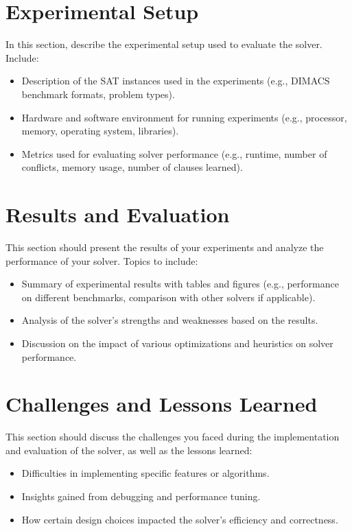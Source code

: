 \documentclass[a4paper,12pt]{article}
\begin{document}
\section{Experimental Setup}
\label{sec:experiment}
In this section, describe the experimental setup used to evaluate the solver. Include:
\begin{itemize}
    \item Description of the SAT instances used in the experiments (e.g., DIMACS benchmark formats, problem types).
    \item Hardware and software environment for running experiments (e.g., processor, memory, operating system, libraries).
    \item Metrics used for evaluating solver performance (e.g., runtime, number of conflicts, memory usage, number of clauses learned).
\end{itemize}

\section{Results and Evaluation}
\label{sec:results}
This section should present the results of your experiments and analyze the performance of your solver. Topics to include:
\begin{itemize}
    \item Summary of experimental results with tables and figures (e.g., performance on different benchmarks, comparison with other solvers if applicable).
    \item Analysis of the solver’s strengths and weaknesses based on the results.
    \item Discussion on the impact of various optimizations and heuristics on solver performance.
\end{itemize}

\section{Challenges and Lessons Learned}
\label{sec:challenges}
This section should discuss the challenges you faced during the implementation and evaluation of the solver, as well as the lessons learned:
\begin{itemize}
    \item Difficulties in implementing specific features or algorithms.
    \item Insights gained from debugging and performance tuning.
    \item How certain design choices impacted the solver’s efficiency and correctness.
\end{itemize}
\end{document}
